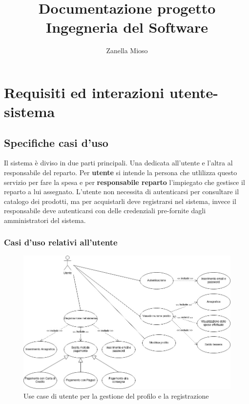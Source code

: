 \documentclass{article}
\author{Zanella Mioso}
\title{Documentazione progetto Ingegneria del Software}
\begin{document}
\maketitle

\newpage

\tableofcontents

\newpage

\section{Requisiti ed interazioni utente-sistema}

\subsection{Specifiche casi d’uso}

Il sistema è diviso in due parti principali. Una dedicata all'utente e l'altra
al responsabile del reparto. Per \textbf{utente} si intende la persona che utlilizza questo
servizio per fare la spesa e per \textbf{responsabile reparto} l'impiegato che gestisce
il reparto a lui assegnato. L’utente non necessita di autenticarsi per consultare il
catalogo dei prodotti, ma per acquistarli deve registrarsi nel sistema, invece il
responsabile deve autenticarsi con delle credenziali pre-fornite dagli amministratori
del sistema.

\subsubsection{Casi d'uso relativi all'utente}

\begin{figure}[h!]
	\centering
	\includegraphics[width=\textwidth]{UseCaseUtenteGestioneProfilo.jpg}
	\caption{Use case di utente per la gestione del profilo e la registrazione}
	\label{fig:UseCaseUtenteGestioneProfilo}
\end{figure}
\end{document}
